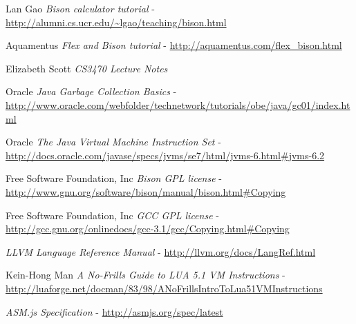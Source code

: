 \documentclass[]{final_report}
\begin{document}
\newpage
\begin{thebibliography}{99}

Lan Gao \emph{Bison calculator tutorial} - \url{http://alumni.cs.ucr.edu/~lgao/teaching/bison.html}

Aquamentus \emph{Flex and Bison tutorial} - \url{http://aquamentus.com/flex\_bison.html}

Elizabeth Scott \emph{CS3470 Lecture Notes}

Oracle \emph{Java Garbage Collection Basics} - \url{http://www.oracle.com/webfolder/technetwork/tutorials/obe/java/gc01/index.html}

Oracle \emph{The Java Virtual Machine Instruction Set} - \url{http://docs.oracle.com/javase/specs/jvms/se7/html/jvms-6.html\#jvms-6.2}

Free Software Foundation, Inc \emph{Bison GPL license} - \url{http://www.gnu.org/software/bison/manual/bison.html\#Copying}

Free Software Foundation, Inc \emph{GCC GPL license} - \url{http://gcc.gnu.org/onlinedocs/gcc-3.1/gcc/Copying.html\#Copying}

\emph{LLVM Language Reference Manual} - \url{http://llvm.org/docs/LangRef.html}

Kein-Hong Man \emph{A No-Frills Guide to LUA 5.1 VM Instructions} - \url{http://luaforge.net/docman/83/98/ANoFrillsIntroToLua51VMInstructions}

 \emph{ASM.js Specification} - \url{http://asmjs.org/spec/latest}

\end{thebibliography}
\label{endpage}
\end{document}

